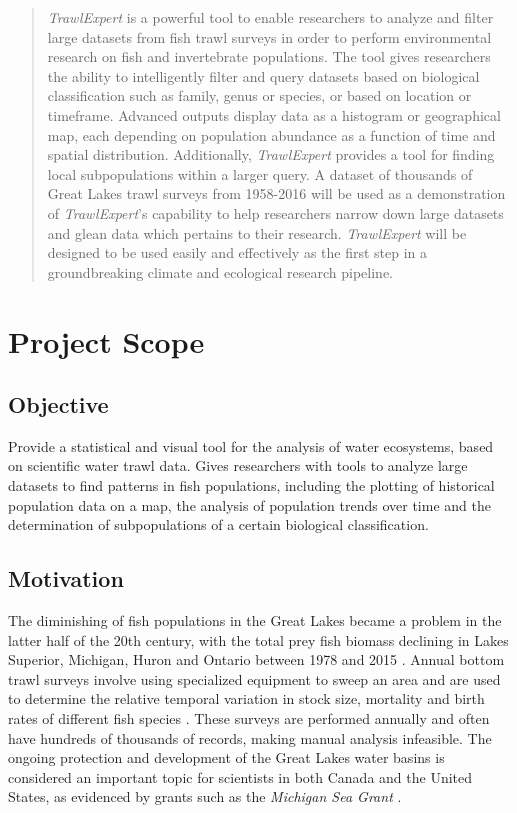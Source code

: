 \documentclass{article}
\begin{document}
\newpage

\begin{abstract}
\noindent \textit{TrawlExpert} is a powerful tool to enable researchers to analyze and filter large datasets from fish trawl surveys in order to perform environmental research on fish and invertebrate populations. The tool gives researchers the ability to intelligently filter and query datasets based on biological classification such as family, genus or species, or based on location or timeframe. Advanced outputs display data as a histogram or geographical map, each depending on population abundance as a function of time and spatial distribution. Additionally, \textit{TrawlExpert} provides a tool for finding local subpopulations within a larger query. A dataset of thousands of Great Lakes trawl surveys from 1958-2016 will be used as a demonstration of \textit{TrawlExpert}'s capability to help researchers narrow down large datasets and glean data which pertains to their research. \textit{TrawlExpert} will be designed to be used easily and effectively as the first step in a groundbreaking climate and ecological research pipeline.
\end{abstract}


\tableofcontents


\section{Project Scope}
\subsection{Objective}
Provide a statistical and visual tool for the analysis of water ecosystems, based on scientific water trawl data. Gives researchers with tools to analyze large datasets to find patterns in fish populations, including the plotting of historical population data on a map, the analysis of population trends over time and the determination of subpopulations of a certain biological classification.

\subsection{Motivation}
The diminishing of fish populations in the Great Lakes became a problem in the latter half of the 20th century, with the total prey fish biomass declining in Lakes Superior, Michigan, Huron and Ontario between 1978 and 2015 \citep{michigan2017}. Annual bottom trawl surveys involve using specialized equipment to sweep an area and are used to determine the relative temporal variation in stock size, mortality and birth rates of different fish species \citep{walsh1997efficiency}. These surveys are performed annually and often have hundreds of thousands of records, making manual analysis infeasible. The ongoing protection and development of the Great Lakes water basins is considered an important topic for scientists in both Canada and the United States, as evidenced by grants such as the \textit{Michigan Sea Grant} \citep{michseagr2018}.
\end{document}
